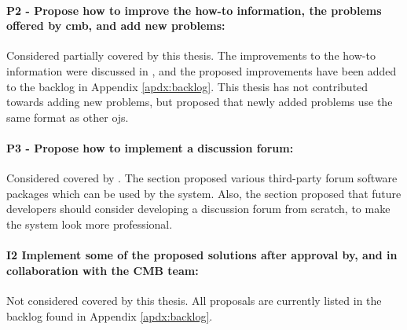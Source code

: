\paragraph*{P2 - Propose how to improve the how-to information, the problems offered by \gls{cmb}, and add new problems:} Considered partially covered by this thesis. The improvements to the how-to information were discussed in , and the proposed improvements have been added to the backlog in Appendix \ref{apdx:backlog}. This thesis has not contributed towards adding new problems, but  proposed that newly added problems use the same format as other \glspl{oj}.

\paragraph*{P3 - Propose how to implement a discussion forum:} Considered covered by . The section proposed various third-party forum software packages which can be used by the system. Also, the section proposed that future developers should consider developing a discussion forum from scratch, to make the system look more professional.

\paragraph*{I2 Implement some of the proposed solutions after approval by, and in collaboration with the CMB team:} Not considered covered by this thesis. All proposals are currently listed in the backlog found in Appendix \ref{apdx:backlog}.
